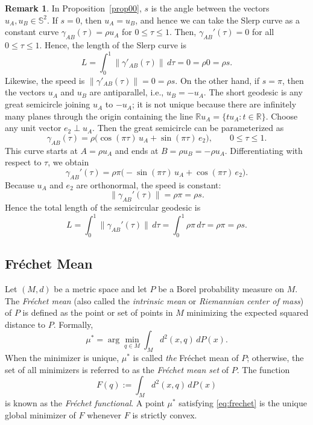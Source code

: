\documentclass[12pt, reqno]{amsart}
\theoremstyle{plain}
\theoremstyle{definition}
\newtheorem{remark1}[subsubsection]{Remark}
\newcommand{\set}[1]{\{#1\}}%
\renewcommand{\gg}{\gamma}%
\newcommand{\gt}{\tau}
\newcommand{\D}[1]{\mathbb{#1}}%
\begin{document}
\begin{remark1} In Proposition~\ref{prop00}, $s$ is the angle between the vectors $u_A, u_B\in \D S^2$. If $s=0$, then $u_A=u_B$, and hence we can take the Slerp curve as a constant curve $\gg_{AB}(\gt)=\rho u_A$ for $0\leq \gt \leq 1$. Then, $\gg_{AB}'(\gt)=0$ for all $0\leq \gt\leq 1$. Hence, the length of the Slerp curve is 
\[L=\int_0^1 \|\gg'_{AB}(\gt)\|\,d\gt=0=\rho  0=\rho s.\]
Likewise, the speed is $\|\gg'_{AB}(\gt)\|=0=\rho s$. On the other hand, if $s = \pi$, then the vectors $u_A$ and $u_B$ are antiparallel, i.e., $u_B = -u_A$. The short geodesic is any great semicircle joining $u_A$ to $-u_A$;
it is not unique because there are infinitely many planes through the origin containing
the line $\mathbb{R}u_A=\set{tu_A : t\in \D R}$.
Choose any unit vector $e_2 \perp u_A$. Then the great semicircle can be parameterized as
\[
\gg_{AB}(\tau) = \rho\big(\cos(\pi\tau)\,u_A + \sin(\pi\tau)\,e_2\big),
\qquad 0 \le \tau \le 1.
\]
This curve starts at $A = \rho u_A$ and ends at $B = \rho u_B = -\rho u_A$.
Differentiating with respect to $\tau$, we obtain
\[
\gg_{AB}'(\tau)
= \rho\pi\big(-\sin(\pi\tau)\,u_A + \cos(\pi\tau)\,e_2\big).
\]
Because $u_A$ and $e_2$ are orthonormal, the speed is constant:
\[
\|\gg_{AB}'(\tau)\|
= \rho\pi
= \rho s.
\]
Hence the total length of the semicircular geodesic is
\[
L = \int_0^1 \|\gg_{AB}'(\tau)\|\,d\tau
  = \int_0^1 \rho\pi\,d\tau
  = \rho\pi
  = \rho s.
\]
\end{remark1} 



\subsection{Fr\'echet Mean}

Let $(M,d)$ be a metric space and let $P$ be a Borel probability measure on $M$.  
The \emph{Fr\'echet mean} (also called the \emph{intrinsic mean} or \emph{Riemannian center of mass}) of $P$ is defined as the point or set of points in $M$ minimizing the expected squared distance to $P$. Formally,
\begin{equation}\label{eq:frechet}
\mu^{*} = \arg\min_{q\in M} \int_{M} d^{2}(x,q)\,dP(x).
\end{equation}
When the minimizer is unique, $\mu^{*}$ is called \emph{the} Fr\'echet mean of $P$; otherwise, the set of all minimizers is referred to as the \emph{Fr\'echet mean set} of $P$.  
The function 
\[
F(q) := \int_{M} d^{2}(x,q)\,dP(x)
\]
is known as the \emph{Fr\'echet functional}. A point $\mu^{*}$ satisfying \eqref{eq:frechet} is the unique global minimizer of $F$ whenever $F$ is strictly convex.
\end{document}

